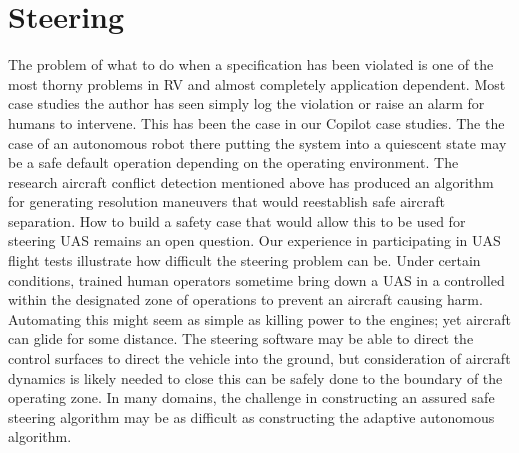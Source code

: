 \section{Steering} \label{sec:steer}

\noindent{}

The problem of what to do when a specification has been violated is
one of the most thorny problems in RV and almost completely
application dependent.  Most case studies the author has seen simply
log the violation or raise an alarm for humans to intervene. This has
been the case in our Copilot case studies. The the case of an
autonomous robot there putting the system into a quiescent state may
be a safe default operation depending on the operating environment.
The research aircraft conflict detection mentioned above has produced
an algorithm for generating resolution maneuvers that would
reestablish safe aircraft separation.  How to build a safety case that
would allow this to be used for steering UAS remains an open question.
Our experience in participating in UAS flight tests illustrate how
difficult the steering problem can be.  Under certain conditions,
trained human operators sometime bring down a UAS in a controlled
within the designated zone of operations to prevent an aircraft
causing harm.  Automating this might seem as simple as killing power
to the engines; yet aircraft can glide for some distance. The steering
software may be able to direct the control surfaces to direct the
vehicle into the ground, but consideration of aircraft dynamics is
likely needed to close this can be safely done to the boundary of the
operating zone.  In many domains, the challenge in constructing an
assured safe steering algorithm may be as difficult as constructing
the adaptive autonomous algorithm.
